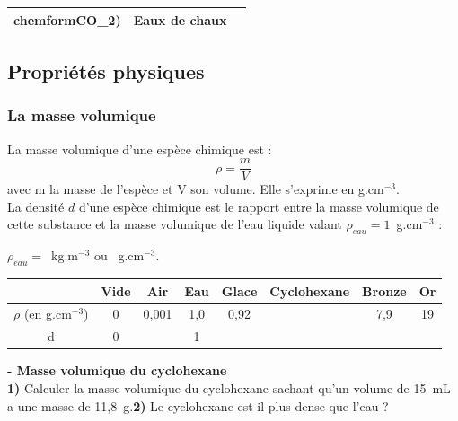 \begin{tcolorbox}[colback=red!5!white,colframe=red!75!black,title=\textbf{Tests chimiques à connaître : }]
\begin{tabular}{|C{0.31}|C{0.3}|C{0.31}|}
chemform{CO_2}) & Eaux de chaux & \\
    \hline
    \end{tabular}
\end{tcolorbox} 

\subsection{Propriétés physiques}
\subsubsection{La masse volumique}
\begin{tcolorbox}[colback=green!5!white,colframe=green!75!black,title=\textbf{Rappel : masse volumique et densité }]
La masse volumique d'une espèce chimique est :
\begin{equation*}
    \rho = \frac{m}{V}
\end{equation*}
avec m la masse de l'espèce et V son volume. Elle s'exprime en g.cm$^{-3}$.\\
La densité $d$ d'une espèce chimique est le rapport entre la masse volumique de cette substance et la masse volumique de l'eau liquide valant $\rho_{eau}=1$~g.cm$^{-3}$ :
\begin{equation*}
\end{equation*}
\end{tcolorbox}

\begin{tcolorbox}[colback=red!5!white,colframe=red!75!black,title=\textbf{Masse volumique de l'eau: }]
\begin{center}
    $\rho_{eau} = $~kg.m$^{-3}$ ou ~g.cm$^{-3}$. 
\end{center}
\end{tcolorbox}

\begin{tabular}{|c|C{0.06}|C{0.06}|C{0.06}|C{0.1}|C{0.15}|C{0.1}|C{0.1}|}
   \hline
     & Vide & Air & Eau & Glace & Cyclohexane & Bronze & Or \\
    \hline
    $\rho$ (en g.cm$^{-3}$) & 0 & 0,001 & 1,0 & 0,92 & & 7,9 & 19  \\
    \hline
    d & 0 &  & 1 &  &  & & \\
    \hline
    \end{tabular}
\begin{mdframed}[style=autreexo]
\textbf{ - Masse volumique du cyclohexane}\\
\textbf{1)} Calculer la masse volumique du cyclohexane sachant qu'un volume de 15~mL a une masse de 11,8~g.\newline \textbf{2)} Le cyclohexane est-il plus dense que l'eau ? \end{mdframed}
\newpage

